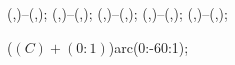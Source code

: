 {{		
		 (\dimleft,\dy)--(\dimleft,\by);
		 (\dimleft,\by)--(\dimleft,\ay);
		 (\bdx,\dimbottom)--(\ax,\dimbottom);
		 (\bdx,\dimbottom)--(\bx,\dimbottom);
		 (\bx,\dimbottom)--(\cx,\dimbottom);
	
		
		 ($(C)+(0:1)$)arc(0:-60:1);

	}
}
